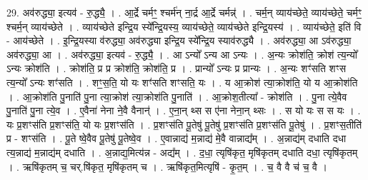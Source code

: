 \documentclass[17pt]{extarticle}
\begin{document}
29. अव॑रुद्ध्या॒ इत्यव॑ - रु॒द्ध्यै॒ । . आ॒र्द्रे चर्मꣳ॒॒ श्चर्म॑न् ना॒र्द्र आ॒र्द्रे चर्मन्न्॑ । . चर्म॒न् व्याय॑च्छेते॒ व्याय॑च्छेते॒ चर्मꣳ॒॒ श्चर्म॒न् व्याय॑च्छेते । . व्याय॑च्छेते इन्द्रि॒य स्ये᳚न्द्रि॒यस्य॒ व्याय॑च्छेते॒ व्याय॑च्छेते इन्द्रि॒यस्य॑ । . व्याय॑च्छेते॒ इति॑ वि - आय॑च्छेते । . इ॒न्द्रि॒यस्या व॑रुद्ध्या॒ अव॑रुद्ध्या इन्द्रि॒य स्ये᳚न्द्रि॒य स्याव॑रुद्ध्यै । . अव॑रुद्ध्या॒ आ ऽव॑रुद्ध्या॒ अव॑रुद्ध्या॒ आ । . अव॑रुद्ध्या॒ इत्यव॑ - रु॒द्ध्यै॒ । . आ ऽन्यो᳚ ऽन्य आ ऽन्यः । . अ॒न्यः क्रोश॑ति॒ क्रोश॑ त्य॒न्यो᳚ ऽन्यः क्रोश॑ति । . क्रोश॑ति॒ प्र प्र क्रोश॑ति॒ क्रोश॑ति॒ प्र । . प्रान्यो᳚ ऽन्यः प्र प्रान्यः । . अ॒न्यः शꣳ॑सति शꣳस त्य॒न्यो᳚ ऽन्यः शꣳ॑सति । . शꣳ॒॒स॒ति॒ यो यः शꣳ॑सति शꣳसति॒ यः । . य आ॒क्रोश॑ त्या॒क्रोश॑ति॒ यो य आ॒क्रोश॑ति । . आ॒क्रोश॑ति पु॒नाति॑ पु॒ना त्या॒क्रोश॑ त्या॒क्रोश॑ति पु॒नाति॑ । . आ॒क्रोश॒तीत्या᳚ - क्रोश॑ति । . पु॒ना त्ये॒वैव पु॒नाति॑ पु॒ना त्ये॒व । . ए॒वैना॑ नेना ने॒वै वैनान्॑ । . ए॒ना॒न् थ्स स ए॑ना नेना॒न् थ्सः । . स यो यः स स यः । . यः प्र॒शꣳस॑ति प्र॒शꣳस॑ति॒ यो यः प्र॒शꣳस॑ति । . प्र॒शꣳस॑ति पू॒तेषु॑ पू॒तेषु॑ प्र॒शꣳस॑ति प्र॒शꣳस॑ति पू॒तेषु॑ । . प्र॒शꣳस॒तीति॑ प्र - शꣳस॑ति । . पू॒ते ष्वे॒वैव पू॒तेषु॑ पू॒तेष्वे॒व । . ए॒वान्नाद्य॑ म॒न्नाद्य॑ मे॒वै वान्नाद्य᳚म् । . अ॒न्नाद्य॑म् दधाति दधा त्य॒न्नाद्य॑ म॒न्नाद्य॑म् दधाति । . अ॒न्नाद्य॒मित्य॑न्न - अद्य᳚म् । . द॒धा॒ त्यृषि॑कृत॒ मृषि॑कृतम् दधाति दधा॒ त्यृषि॑कृतम् । . ऋषि॑कृतम् च॒ चर्.षि॑कृत॒ मृषि॑कृतम् च । . ऋषि॑कृत॒मित्यृषि॑ - कृ॒त॒म् । . च॒ वै वै च॑ च॒ वै । \newline
\end{document}
